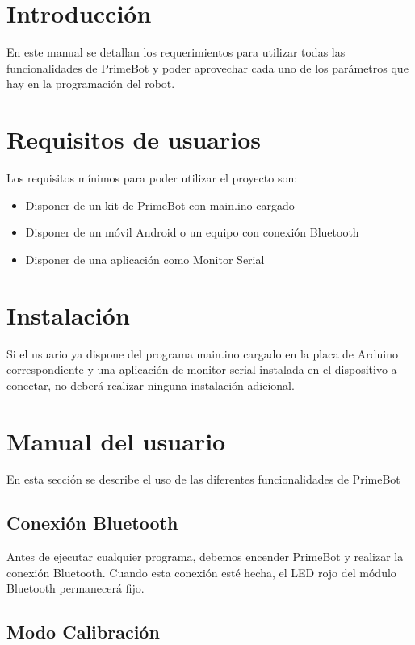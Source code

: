 
\section{Introducción}

En este manual se detallan los requerimientos para utilizar todas las funcionalidades de PrimeBot y poder aprovechar cada uno de los parámetros que hay en la programación del robot.

\section{Requisitos de usuarios}

Los requisitos mínimos para poder utilizar el proyecto son:

\begin{itemize}
\tightlist
\item
  Disponer de un kit de PrimeBot con main.ino cargado
  \item
  Disponer de un móvil Android o un equipo con conexión Bluetooth
  \item
  Disponer de una aplicación como Monitor Serial
\end{itemize}

\section{Instalación}

Si el usuario ya dispone del programa main.ino cargado en la placa de Arduino correspondiente y una aplicación de monitor serial instalada en el dispositivo a conectar, no deberá realizar ninguna instalación adicional.

\section{Manual del usuario}

En esta sección se describe el uso de las diferentes funcionalidades de PrimeBot
\subsection {Conexión Bluetooth}

Antes de ejecutar cualquier programa, debemos encender PrimeBot y realizar la conexión Bluetooth.
Cuando esta conexión esté hecha, el LED rojo del módulo Bluetooth permanecerá fijo.

\subsection {Modo Calibración}

